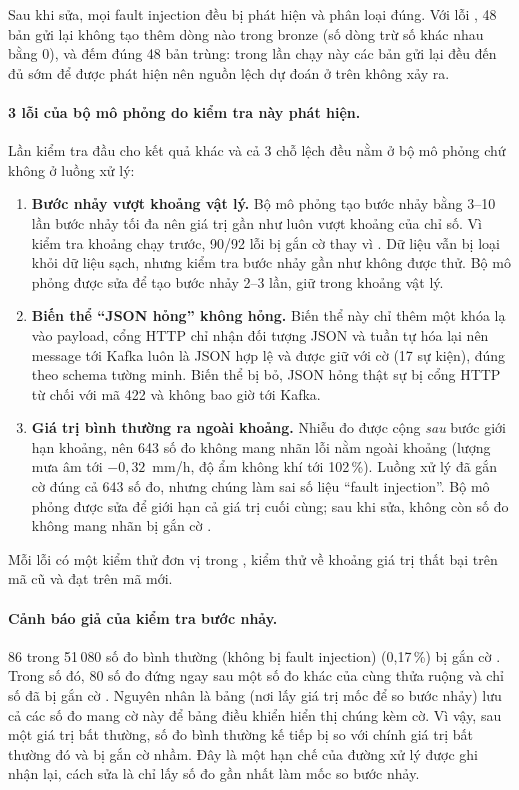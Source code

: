 Sau khi sửa, mọi fault injection đều bị phát hiện và phân loại đúng. Với lỗi , 48 bản gửi lại không tạo thêm dòng nào trong bronze (số dòng trừ số  khác nhau bằng 0), và  đếm đúng 48 bản trùng: trong lần chạy này các bản gửi lại đều đến đủ sớm để được phát hiện nên nguồn lệch dự đoán ở trên không xảy ra.

\paragraph{3 lỗi của bộ mô phỏng do kiểm tra này phát hiện.} Lần kiểm tra đầu cho kết quả khác và cả 3 chỗ lệch đều nằm ở bộ mô phỏng chứ không ở luồng xử lý:

\begin{enumerate}
  \item \textbf{Bước nhảy vượt khoảng vật lý.} Bộ mô phỏng tạo bước nhảy bằng 3--10 lần bước nhảy tối đa nên giá trị gần như luôn vượt khoảng của chỉ số. Vì kiểm tra khoảng chạy trước, 90/92 lỗi bị gắn cờ  thay vì . Dữ liệu vẫn bị loại khỏi dữ liệu sạch, nhưng kiểm tra bước nhảy gần như không được thử. Bộ mô phỏng được sửa để tạo bước nhảy 2--3 lần, giữ trong khoảng vật lý.
  \item \textbf{Biến thể ``JSON hỏng'' không hỏng.} Biến thể này chỉ thêm một khóa lạ vào payload, cổng HTTP chỉ nhận đối tượng JSON và tuần tự hóa lại nên message tới Kafka luôn là JSON hợp lệ và được giữ với cờ  (17 sự kiện), đúng theo schema tường minh. Biến thể bị bỏ, JSON hỏng thật sự bị cổng HTTP từ chối với mã 422 và không bao giờ tới Kafka.
  \item \textbf{Giá trị bình thường ra ngoài khoảng.} Nhiễu đo được cộng \emph{sau} bước giới hạn khoảng, nên 643 số đo không mang nhãn lỗi nằm ngoài khoảng (lượng mưa âm tới $-0{,}32$~mm/h, độ ẩm không khí tới 102\,\%). Luồng xử lý đã gắn cờ đúng cả 643 số đo, nhưng chúng làm sai số liệu ``fault injection''. Bộ mô phỏng được sửa để giới hạn cả giá trị cuối cùng; sau khi sửa, không còn số đo không mang nhãn bị gắn cờ .
\end{enumerate}

Mỗi lỗi có một kiểm thử đơn vị trong , kiểm thử về khoảng giá trị thất bại trên mã cũ và đạt trên mã mới.

\paragraph{Cảnh báo giả của kiểm tra bước nhảy.} 86 trong 51\,080 số đo bình thường (không bị fault injection) (0,17\,\%) bị gắn cờ . Trong số đó, 80 số đo đứng ngay sau một số đo khác của cùng thửa ruộng và chỉ số đã bị gắn cờ . Nguyên nhân là bảng  (nơi lấy giá trị mốc để so bước nhảy) lưu cả các số đo mang cờ này để bảng điều khiển hiển thị chúng kèm cờ. Vì vậy, sau một giá trị bất thường, số đo bình thường kế tiếp bị so với chính giá trị bất thường đó và bị gắn cờ nhầm. Đây là một hạn chế của đường xử lý được ghi nhận lại, cách sửa là chỉ lấy số đo  gần nhất làm mốc so bước nhảy.

